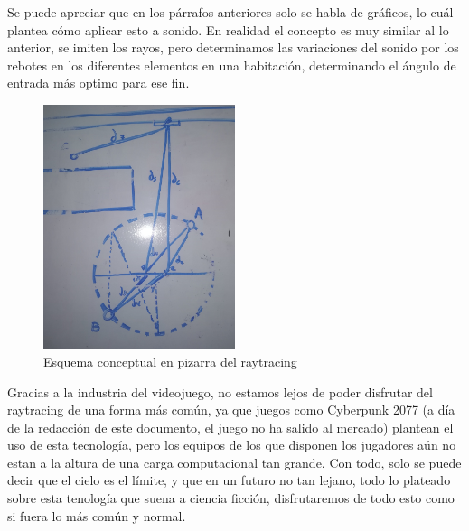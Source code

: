 \quad Se puede apreciar que en los párrafos anteriores solo se habla de gráficos, lo cuál plantea cómo aplicar esto a sonido. En realidad el concepto es muy similar al lo anterior, se imiten los rayos, pero determinamos las variaciones del sonido por los rebotes en los diferentes elementos en una habitación, determinando el ángulo de entrada más optimo para ese fin.\\

\begin{figure}[htb]
	\centering
	\includegraphics[width=0.5\textwidth]{./imagenes/pizarra}
	\caption{Esquema conceptual en pizarra del raytracing}
\end{figure} 

\quad Gracias a la industria del videojuego, no estamos lejos de poder disfrutar del raytracing de una forma más común, ya que juegos como Cyberpunk 2077 (a día de la redacción de este documento, el juego no ha salido al mercado) plantean el uso de esta tecnología, pero los equipos de los que disponen los jugadores aún no estan a la altura de una carga computacional tan grande. Con todo, solo se puede decir que el cielo es el límite, y que en un futuro no tan lejano, todo lo plateado sobre esta tenología que suena a ciencia ficción, disfrutaremos de todo esto como si fuera lo más común y normal.\\ 

\newpage


